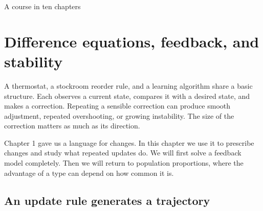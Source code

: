 \documentclass[11pt,oneside,openany]{book}
\theoremstyle{definition}
\theoremstyle{remark}
\numberwithin{equation}{chapter}
\begin{document}
\begin{titlepage}\color{ink}\centering\vspace*{1.0in}{\small\sffamily PROBABILITY AND MATHEMATICAL MODELLING\par}\vspace{.45in}{\Huge\bfseries Discrete Information\\[.12in]Geometry\par}\vspace{.35in}{\Large Finite Differences, Probability,\\and Information Flows\par}\vspace{1cm}{\Large Chapter 2\par}\vfill{}\vfill{\large A course in ten chapters\par}\end{titlepage}
\setcounter{chapter}{1}

\chapter{Difference equations, feedback, and stability}
A thermostat, a stockroom reorder rule, and a learning algorithm share a basic structure. Each observes a current state, compares it with a desired state, and makes a correction. Repeating a sensible correction can produce smooth adjustment, repeated overshooting, or growing instability. The size of the correction matters as much as its direction.

Chapter 1 gave us a language for changes. In this chapter we use it to prescribe changes and study what repeated updates do. We will first solve a feedback model completely. Then we will return to population proportions, where the advantage of a type can depend on how common it is.

\section{An update rule generates a trajectory}\label{ch02-an-update-rule-generates-a-trajectory}
\end{document}
